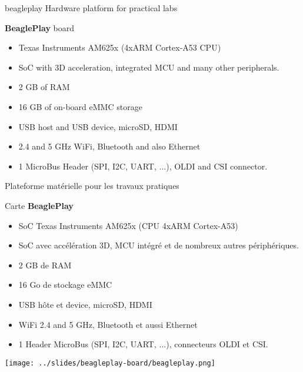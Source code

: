 {beagleplay}
{Hardware platform for practical labs}
{
  {\bf BeaglePlay} board
  \begin{itemize}
    \item Texas Instruments AM625x (4xARM Cortex-A53 CPU)
    \item SoC with 3D acceleration, integrated MCU and many other peripherals.
    \item 2 GB of RAM
    \item 16 GB of on-board eMMC storage
    \item USB host and USB device, microSD, HDMI
    \item 2.4 and 5 GHz WiFi, Bluetooth and also Ethernet
    \item 1 MicroBus Header (SPI, I2C, UART, ...), OLDI and CSI connector.
  \end{itemize}
}
{Plateforme matérielle pour les travaux pratiques}
{
  Carte {\bf BeaglePlay}
  \begin{itemize}
    \item SoC Texas Instruments AM625x (CPU 4xARM Cortex-A53)
    \item SoC avec accélération 3D, MCU intégré et de nombreux autres périphériques.
    \item 2 GB de RAM
    \item 16 Go de stockage eMMC
    \item USB hôte et device, microSD, HDMI
    \item WiFi 2.4 and 5 GHz, Bluetooth et aussi Ethernet
    \item 1 Header MicroBus (SPI, I2C, UART, ...), connecteurs OLDI et CSI.
  \end{itemize}
}
{
  \begin{center}
    \texttt{[image: ../slides/beagleplay-board/beagleplay.png]}
  \end{center}
}
